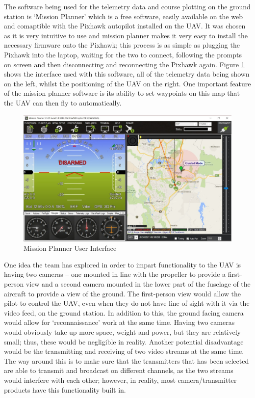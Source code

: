 \documentclass[12pt]{article}
\begin{document}
\noindent The software being used for the telemetry data and course plotting on the ground station is ‘Mission Planner’ which is a free software, easily available on the web and comaptible with the Pixhawk autopilot installed on the UAV. It was chosen as it is very intuitive to use and mission planner makes it very easy to install the necessary firmware onto the Pixhawk; this process is as simple as plugging the Pixhawk into the laptop, waiting for the two to connect, following the prompts on screen and then disconnecting and reconnecting the Pixhawk again. Figure \ref{mission} shows the interface used with this software, all of the telemetry data being shown on the left, whilst the positioning of the UAV on the right. One important feature of the mission planner software is its ability to set waypoints on this map that the UAV can then fly to automatically. \\

\begin{figure}[hptb]
    \includegraphics[width=13cm]{mission_planner.png}
    \caption{Mission Planner User Interface}
    \label{mission}
\end{figure}

\noindent One idea the team has explored in order to impart functionality to the UAV is having two cameras – one mounted in line with the propeller to provide a first-person view and a second camera mounted in the lower part of the fuselage of the aircraft to provide a view of the ground. The first-person view would allow the pilot to control the UAV, even when they do not have line of sight with it via the video feed, on the ground station. In addition to this, the ground facing camera would allow for ‘reconnaissance’ work at the same time. Having two cameras would obviously take up more space, weight and power, but they are relatively small; thus, these would be negligible in reality. Another potential disadvantage would be the transmitting and receiving of two video streams at the same time. The way around this is to make sure that the transmitters that has been selected are able to transmit and broadcast on different channels, as the two streams would interfere with each other; however, in reality, most camera/transmitter products have this functionality built in. \\
\end{document}
